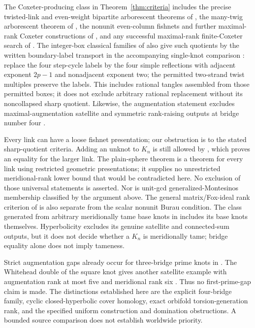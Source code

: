 \documentclass[11pt]{article}
\begin{document}
The Coxeter-producing class in Theorem~\ref{thm:criteria} includes the
precise twisted-link and even-weight bipartite arborescent theorems
of \cite{bbk}, the many-twig arborescent theorem of \cite{twigs},
the nonunit even-column fishnets and further maximal-rank Coxeter
constructions of \cite{fishnet}, and any successful maximal-rank
finite-Coxeter search of \cite{bkm}. The integer-box classical families of
\cite{jp} also give such quotients by the written boundary-label
transport in the accompanying single-knot comparison \cite{comparison}:
replace the four step-cycle labels by the four simple reflections
with adjacent exponent $2p-1$ and nonadjacent exponent two;
the permitted two-strand twist multiples preserve the labels.
This includes rational tangles assembled from those permitted boxes;
it does not exclude arbitrary rational replacement without its
noncollapsed sharp quotient. Likewise, the augmentation statement
excludes maximal-augmentation satellite and symmetric rank-raising
outputs at bridge number four \cite{ch,cornwell}.

Every link can have a loose fishnet presentation; our obstruction is
to the stated sharp-quotient criteria. Adding an unknot to $K_n$ is
still allowed by \cite[Theorem~1.1]{fishnet}, which proves an equality
for the larger link. The plain-sphere theorem \cite[Theorem~1.1]{plain}
is a theorem for every link using restricted geometric presentations;
it supplies no unrestricted meridional-rank lower bound that would
be contradicted here. No exclusion of those universal statements
is asserted. Nor is unit-gcd generalized-Montesinos membership
classified by the argument above. The general matrix/Fox-ideal rank
criterion of \cite[Theorem3.5]{moriah} is also separate from the
scalar nonunit Burau condition. The class generated from arbitrary
meridionally tame base knots in \cite[Theorem1]{bdjw} includes its
base knots themselves. Hyperbolicity excludes its genuine satellite
and connected-sum outputs, but it does not decide whether a $K_n$
is meridionally tame; bridge equality alone does not imply tameness.

Strict augmentation gaps already occur for three-bridge prime knots
in \cite[Corollary~1.12]{cornwell}. The Whitehead double of the square
knot gives another satellite example with augmentation rank
at most five and meridional rank six \cite[Theorem~1.3]{whitehead}.
Thus no first-prime-gap claim is made. The distinctions established
here are the explicit four-bridge family, cyclic closed-hyperbolic
cover homology, exact orbifold torsion-generation rank, and the
specified uniform construction and domination obstructions.
A bounded source comparison does not establish worldwide priority.
\end{document}
